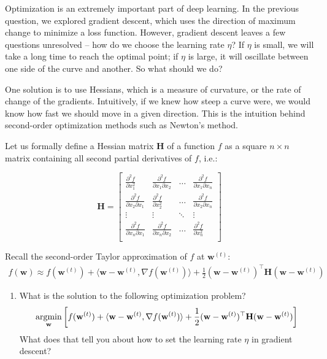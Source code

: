 
Optimization is an extremely important part of deep learning. In the previous question, we explored gradient descent, which uses the direction of maximum change to minimize a loss function. However, gradient descent leaves a few questions unresolved -- how do we choose the learning rate $\eta$? If $\eta$ is small, we will take a long time to reach the optimal point; if $\eta$ is large, it will oscillate between one side of the curve and another. So what should we do? 

One solution is to use Hessians, which is a measure of curvature, or the rate of change of the gradients. Intuitively, if we knew how steep a curve were, we would know how fast we should move in a given direction. This is the intuition behind second-order optimization methods such as Newton's method. 

Let us formally define a Hessian matrix $\mathbf{H}$ of a function $f$ as a square $n \times n$ matrix containing all second partial derivatives of $f$, i.e.:

\[ \mathbf{H} = 
\begin{bmatrix}
    \frac{\partial^2 f}{\partial x_1^2} & \frac{\partial^2 f}{\partial x_1 \partial x_2} & \dots  & \frac{\partial^2 f}{\partial x_1 \partial x_n} \\
    \frac{\partial^2 f}{\partial x_2 \partial x_1} & \frac{\partial^2 f}{\partial x_2^2 } & \dots  & \frac{\partial^2 f}{\partial x_2 \partial x_n} \\
    \vdots & \vdots  & \ddots & \vdots\\
    \frac{\partial^2 f}{\partial x_n \partial x_1} & \frac{\partial^2 f}{\partial x_n \partial x_2} & \dots  & \frac{\partial^2 f}{\partial x_n^2} \\
\end{bmatrix}
\]

Recall the second-order Taylor approximation of $f$ at $\mathbf{w}^{(t)}$:
%
\begin{align}
f(\mathbf{w}) \approx f(\mathbf{w}^{(t)}) + \langle \mathbf{w}-\mathbf{w}^{(t)},
\nabla f(\mathbf{w}^{(t)}) \rangle + \frac{1}{2}(\mathbf{w}-\mathbf{w}^{(t)})^\top
\mathbf{H} (\mathbf{w}-\mathbf{w}^{(t)})
\end{align}

\begin{enumerate} 
\item What is the solution to the following optimization problem? %
\begin{align}
    \mathop{\mathrm{argmin}}_\mathbf{w}
    \left[
    f(\mathbf{w}^{(t)}) + \langle \mathbf{w}-\mathbf{w}^{(t)},
    \nabla f(\mathbf{w}^{(t)}) \rangle + \frac{1}{2}(\mathbf{w}-\mathbf{w}^{(t)})^\top
    \mathbf{H} (\mathbf{w}-\mathbf{w}^{(t)})
    \right]
\end{align}
What does that tell you about how to set the learning rate $\eta$ in gradient descent?
\end{enumerate}

